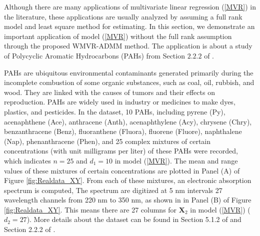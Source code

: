 \documentclass[alpha-refs]{wiley-article}
\begin{document}
Although there are many applications of multivariate linear regression (\ref{MVR}) in the literature, these applications are usually analyzed by assuming a full rank model and least square method for estimating. 
In this section, we demonstrate an important application of model (\ref{MVR}) without the full rank assumption through the proposed WMVR-ADMM method. 
The application is about a study of Polycyclic Aromatic Hydrocarbons (PAHs) from Section $2.2.2$ of \citet{isenmann2008modern}.

PAHs are ubiquitous environmental contaminants generated primarily during the incomplete combustion of some organic substances, such as coal, oil, rubbish, and wood. They are linked with the causes of tumors and their effects on reproduction. PAHs are widely used in industry or medicines to make dyes, plastics, and pesticides. In the dataset, 10 PAHs, including pyrene (Py), acenaphthene (Ace), anthracene (Anth), acenaphthylene (Acy), chrysene (Chry), benzanthracene (Benz), fluoranthene (Fluora), fluorene (Fluore), naphthalene (Nap), phenanthracene (Phen), and 25 complex mixtures of certain concentrations (with unit milligrams per liter) of these PAHs were recorded, which indicates $n = 25$ and $d_{1} = 10$ in model (\ref{MVR}). The mean and range values of these mixtures of certain concentrations are plotted in Panel (A) of Figure \ref{fig:Realdata_XY}. 
From each of these mixtures, an electronic absorption spectrum is computed, The spectrum are digitized at 5 nm intervals 27 wavelength channels from 220 nm to 350 nm, as shown in in Panel (B) of Figure \ref{fig:Realdata_XY}.  This means there are 27 columns for $\boldsymbol{X}_{2}$ in model (\ref{MVR}) ($d_{2}  = 27$). More details about the dataset can be found in Section 5.1.2 of \citet{brereton2003chemometrics} and Section 2.2.2 of \citet{isenmann2008modern}.

\end{document}
